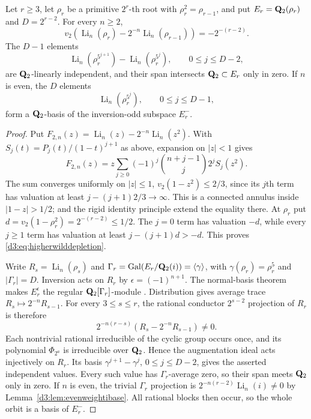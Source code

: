 \begin{proposition}
\label{d3:prop:higherwildaugmentation}
Let $r\geq3$, let $\rho_r$ be a primitive $2^r$-th root with
$\rho_r^2=\rho_{r-1}$, and put
$E_r=\mathbf Q_2(\rho_r)$ and $D=2^{r-2}$.
For every $n\geq2$,
\begin{equation}\label{d3:eq:higherwilddepletion}
 v_2\left(\operatorname{Li}_n(\rho_r)
       -2^{-n}\operatorname{Li}_n(\rho_{r-1})\right)
 =-2^{-(r-2)}.
\end{equation}
The $D-1$ elements
\[
 \operatorname{Li}_n(\rho_r^{5^{j+1}})
 -\operatorname{Li}_n(\rho_r^{5^j}),
 \qquad 0\leq j\leq D-2,
\]
are $\mathbf Q_2$-linearly independent, and their span intersects
$\mathbf Q_2\subset E_r$ only in zero.
If $n$ is even, the $D$ elements
\[
 \operatorname{Li}_n(\rho_r^{5^j}),\qquad 0\leq j\leq D-1,
\]
form a $\mathbf Q_2$-basis of the inversion-odd subspace $E_r^-$.
\end{proposition}
\begin{proof}
Put $F_{2,n}(z)=\operatorname{Li}_n(z)-2^{-n}\operatorname{Li}_n(z^2)$.
With $S_j(t)=P_j(t)/(1-t)^{j+1}$ as above, expansion on $|z|<1$ gives
\[
 F_{2,n}(z)=z\sum_{j\geq0}(-1)^j
       \binom{n+j-1}{j}2^j S_j(z^2).
\]
The sum converges uniformly on
$|z|\leq1$, $v_2(1-z^2)\leq2/3$, since its $j$th term has
valuation at least $j-(j+1)2/3\to\infty$.
This is a connected annulus inside $|1-z|>1/2$;
\cite[Theorem~2.7(3)]{BesserDeJeuAlgorithm} and the rigid identity
principle extend the equality there. At $\rho_r$ put
$d=v_2(1-\rho_r^2)=2^{-(r-2)}\leq1/2$.
The $j=0$ term has valuation $-d$, while every $j\geq1$ term
has valuation at least $j-(j+1)d>-d$.
This proves \eqref{d3:eq:higherwilddepletion}.

Write $R_s=\operatorname{Li}_n(\rho_s)$ and
$\Gamma_r=\operatorname{Gal}(E_r/\mathbf Q_2(i))=\langle\gamma\rangle$, with
$\gamma(\rho_r)=\rho_r^5$ and $|\Gamma_r|=D$.
Inversion acts on $R_r$ by $\epsilon=(-1)^{n+1}$.
The normal-basis theorem makes $E_r^\epsilon$ the regular
$\mathbf Q_2[\Gamma_r]$-module \cite[Chapter~I, p.~34]{MilneDuality}. Distribution gives average trace
$R_s\mapsto2^{-n}R_{s-1}$.
For every $3\leq s\leq r$, the rational conductor
$2^{s-2}$ projection of $R_r$ is therefore
\[
 2^{-n(r-s)}(R_s-2^{-n}R_{s-1})\ne0.
\]
Each nontrivial rational irreducible of the cyclic group occurs
once, and its polynomial $\Phi_{2^a}$ is irreducible over $\mathbf Q_2$.
Hence the augmentation ideal acts injectively on $R_r$.
Its basis $\gamma^{j+1}-\gamma^j$, $0\leq j\leq D-2$, gives
the asserted independent values. Every such value has
$\Gamma_r$-average zero, so their span meets $\mathbf Q_2$ only in zero.
If $n$ is even, the trivial $\Gamma_r$ projection is
$2^{-n(r-2)}\operatorname{Li}_n(i)\ne0$ by
Lemma~\ref{d3:lem:evenweightibase}. All rational blocks then occur,
so the whole orbit is a basis of $E_r^-$.
\end{proof}

